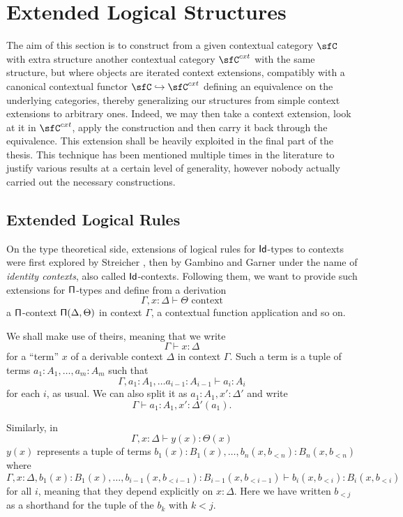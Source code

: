 \chapter{Extended Logical Structures}

The aim of this section is to construct from a given contextual category $\sfC$
with extra structure another contextual category $\sfC^{cxt}$ with the same
structure, but where objects are iterated context extensions, compatibly with a
canonical contextual functor $\sfC\hookrightarrow\sfC^{cxt}$ defining an
equivalence on the underlying categories, thereby
generalizing our structures from simple context extensions to arbitrary ones.
Indeed, we may then take a context extension, look at it in $\sfC^{cxt}$, apply
the construction and then carry it back through the equivalence. This extension
shall be heavily exploited in the final part of the thesis. This technique has
been mentioned multiple times in the literature to justify various results at a
certain level of generality, however nobody actually carried out the necessary
constructions.

\section{Extended Logical Rules}

On the type theoretical side, extensions of logical rules for $\operatorname{\mathsf{Id}}$-types to
contexts were first explored by Streicher \cite{Str93}, then by Gambino and
Garner \cite{GG08} under the name of \emph{identity contexts}, also called
$\operatorname{\mathsf{Id}}$-contexts. Following them,
we want to provide such extensions for $\operatorname{\mathsf{\Pi}}$-types and define from a derivation
\[\Gamma,x:\Delta\vdash \Theta \text{ context}\]
a $\operatorname{\mathsf{\Pi}}$-context $\operatorname{\mathsf{\Pi}}(\Delta,\Theta)$ in context $\Gamma$, a contextual
function application and so on.

\begin{notation}
  We shall make use of theirs, meaning that we write
  \[\Gamma\vdash x:\Delta\]
  for a ``term'' $x$ of a derivable context $\Delta$ in context $\Gamma$. Such a
  term is a tuple of terms $a_1:A_1,\ldots,a_m:A_m$ such that
  \[\Gamma,a_1:A_1,\ldots a_{i-1}:A_{i-1}\vdash a_i:A_i\]
  for each $i$, as usual. We can also split it as $a_1:A_1,x':\Delta'$ and write
  \[\Gamma\vdash a_1:A_1,x':\Delta'(a_1).\]

  Similarly, in
  \[\Gamma,x:\Delta\vdash y(x):\Theta(x)\]
  $y(x)$ represents a tuple of terms
  $b_1(x):B_1(x),\ldots,b_n(x,b_{<n}):B_n(x,b_{<n})$
  where
  \[\Gamma,x:\Delta,
    b_1(x):B_1(x),\ldots,b_{i-1}(x,b_{<i-1}):B_{i-1}(x,b_{<i-1})
  \vdash b_i(x,b_{<i}):B_i(x,b_{<i})\]
  for all $i$, meaning that they depend explicitly on $x:\Delta$. Here we have
  written $b_{<j}$ as a shorthand for the tuple of the $b_k$ with $k<j$.
\end{notation}

